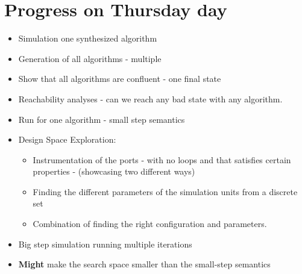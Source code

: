 \documentclass[runningheads]{llncs}
\begin{document}
\section{Progress on Thursday day}
\begin{itemize}
  \item Simulation one synthesized algorithm
  \item Generation of all algorithms - multiple
  \item Show that all algorithms are confluent - one final state
  \item Reachability analyses - can we reach any bad state with any algorithm.
  \item Run for one algorithm - small step semantics
  \item Design Space Exploration:
  \begin{itemize}
    \item Instrumentation of the ports - with no loops and that satisfies certain properties - (showcasing two different ways)
    \item Finding the different parameters of the simulation units from a discrete set
    \item Combination of finding the right configuration and parameters.
  \end{itemize}
  \item Big step simulation running multiple iterations
  \item \textbf{Might} make the search space smaller than the small-step semantics
\end{itemize}
















%




\end{document}
